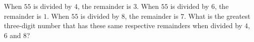 When $55$ is divided by $4$, the remainder is $3$. When $55$ is divided by $6$, the remainder is $1$. When $55$ is divided by $8$, the remainder is $7$. What is the greatest three-digit number that has these same respective remainders when divided by $4$, $6$ and $8$?
